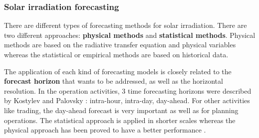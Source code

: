 
 
  



\subsubsection{Solar irradiation forecasting}

There are different types of forecasting methods for solar irradiation. There are two different approaches: \textbf{physical methods} and \textbf{statistical methods}. Physical methods are based on the radiative transfer equation and physical variables whereas the statistical or empirical methods are based on historical data.

The application of each kind of forecasting models is closely related to the \textbf{forecast horizon} that wants to be addressed, as well as the horizontal resolution. In the operation activities, 3 time forecasting horizons were described by Kostylev and Palovsky \cite*{kostylev2011solar}: intra-hour, intra-day, day-ahead. For other activities like trading, the day-ahead forecast is very important as well as for planning operations. The statistical approach is applied in shorter scales whereas the physical approach has been proved to have a better performance \cite*{Perez2010, Diagne2013, Widen2015}.%

